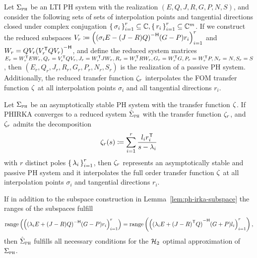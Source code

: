 \begin{lemma}\label{lem:ph-irka-subspace}
    Let $\Sigma_{\textnormal{\scshape ph}}$ be an \ac{LTI} \ac{PH} system with the realization $(E, Q, J, R, G, P, N, S)$, and consider the following sets of sets of interpolation points and tangential directions closed under complex conjugation ${\left\{\,\sigma_i\,\right\}}_{i = 1}^r \subseteq \mathbb{C}, {\left\{\,r_i\,\right\}}_{i = 1}^r \subseteq \mathbb{C}^m$.
    If we construct the reduced subspaces $V_r \coloneqq {\left( {(\sigma_i E - (J - R) Q)}\inv (G - P) r_i \right)}_{i = 1}^r$ and $W_r = Q V_r {(V_r\trans Q V_r)}\inv$, and define the reduced system matrices $E_r = W_r^{\mkern1mu \mathsf{T}} E W_r, Q_r = V_r^{\mkern1mu \mathsf{T}} Q V_r, J_r = W_r^{\mkern1mu \mathsf{T}} J W_r, R_r = W_r^{\mkern1mu \mathsf{T}} R W_r, G_r = W_r^{\mkern1mu \mathsf{T}} G, P_r = W_r^{\mkern1mu \mathsf{T}} P, N_r = N, S_r = S$, then $(E_r, Q_r, J_r, R_r, G_r, P_r, N_r, S_r)$ is the realization of a passive \ac{PH} system.
    Additionally, the reduced transfer function $\zeta_r$ interpolates the \ac{FOM} transfer function $\zeta$ at all interpolation points $\sigma_i$ and all tangential directions $r_i$.
\end{lemma}

\begin{theorem}\label{thm:ph-irka-subspace}
    Let $\Sigma_{\textnormal{\scshape ph}}$ be an asymptotically stable \ac{PH} system with the transfer function $\zeta$.
    If \ac{PHIRKA} converges to a reduced system $\hat{\Sigma}_{\textnormal{\scshape ph}}$ with the transfer function $\zeta_r$, and $\zeta_r$ admits the decomposition
    \begin{equation*}
        \zeta_r(s) \coloneqq \sum\limits_{i = 1}^r \frac{l_i r_i^{\mkern1mu \mathsf{T}}}{s - \lambda_i}
    \end{equation*}
    with $r$ distinct poles ${\left\{\,\lambda_i\,\right\}}_{i = 1}^r$, then $\zeta_r$ represents an asymptotically stable and passive \ac{PH} system and it interpolates the full order transfer function $\zeta$ at all interpolation points $\sigma_i$ and tangential directions $r_i$.

    If in addition to the subspace construction in Lemma~\ref{lem:ph-irka-subspace} the ranges of the subspaces fulfill
    \begin{equation*}
        \range{{\left( {(\lambda_i E + (J - R) Q)}\inv (G - P) r_i \right)}_{i = 1}^r} = \range{{\left( {(\lambda_i E + {(J - R)}\trans Q)}\inv (G + P) l_i \right)}_{i = 1}^r},
    \end{equation*}
    then $\hat{\Sigma}_{\textnormal{\scshape ph}}$ fulfills all necessary conditions for the $\mathcal{H}_2$ optimal approximation of $\Sigma_{\textnormal{\scshape ph}}$.
\end{theorem}


